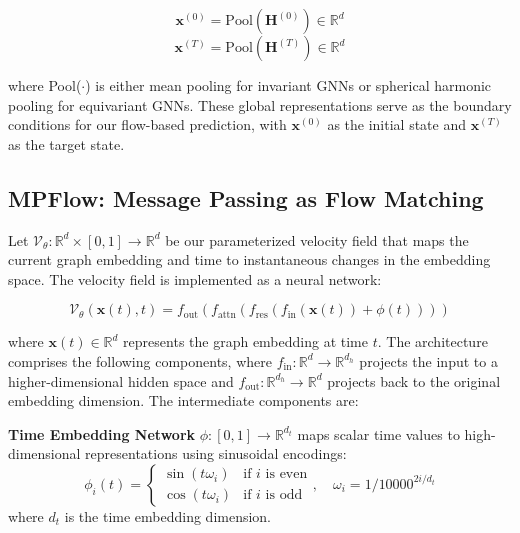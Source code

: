 \documentclass{article}
\begin{document}
\begin{equation}
\mathbf{x}^{(0)} = \text{Pool}(\mathbf{H}^{(0)}) \in \mathbb{R}^d
\end{equation}
\begin{equation}
\mathbf{x}^{(T)} = \text{Pool}(\mathbf{H}^{(T)}) \in \mathbb{R}^d
\end{equation}

where Pool($\cdot$) is either mean pooling for invariant GNNs or spherical harmonic pooling for equivariant GNNs. 
These global representations serve as the boundary conditions for our flow-based prediction, with $\mathbf{x}^{(0)}$ as the initial state and $\mathbf{x}^{(T)}$ as the target state.

\subsection{MPFlow: Message Passing as Flow Matching}

Let $\mathcal{V}_\theta: \mathbb{R}^d \times [0,1] \rightarrow \mathbb{R}^d$ be our parameterized velocity field that maps the current graph embedding and time to instantaneous changes in the embedding space. 
The velocity field is implemented as a neural network:

\begin{equation}
\mathcal{V}_\theta(\mathbf{x}(t), t) = f_\text{out}(f_\text{attn}(f_\text{res}(f_\text{in}(\mathbf{x}(t)) + \phi(t))))
\end{equation}

where $\mathbf{x}(t) \in \mathbb{R}^d$ represents the graph embedding at time $t$. 
The architecture comprises the following components, where $f_\text{in}: \mathbb{R}^d \rightarrow \mathbb{R}^{d_h}$ projects the input to a higher-dimensional hidden space and $f_\text{out}: \mathbb{R}^{d_h} \rightarrow \mathbb{R}^d$ projects back to the original embedding dimension. 
The intermediate components are:

\textbf{Time Embedding Network} $\phi: [0,1] \rightarrow \mathbb{R}^{d_t}$ maps scalar time values to high-dimensional representations using sinusoidal encodings:
\begin{equation}
\phi_i(t) = \begin{cases}
\sin(t \omega_i) & \text{if } i \text{ is even} \\
\cos(t \omega_i) & \text{if } i \text{ is odd}
\end{cases}, \quad \omega_i = 1/10000^{2i/d_t}
\end{equation}
where $d_t$ is the time embedding dimension.
\end{document}
